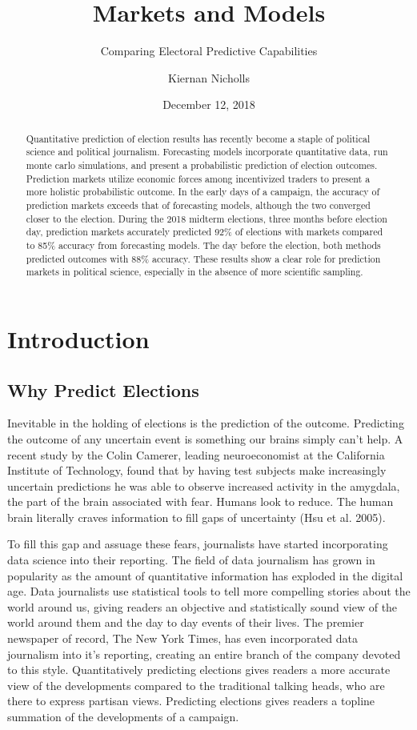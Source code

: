 \documentclass[]{article}
\title{Markets and Models}
\subtitle{Comparing Electoral Predictive Capabilities}
\author{Kiernan Nicholls}
\date{December 12, 2018}
\begin{document}
\maketitle
\begin{abstract}
Quantitative prediction of election results has recently become a staple
of political science and political journalism. Forecasting models
incorporate quantitative data, run monte carlo simulations, and present
a probabilistic prediction of election outcomes. Prediction markets
utilize economic forces among incentivized traders to present a more
holistic probabilistic outcome. In the early days of a campaign, the
accuracy of prediction markets exceeds that of forecasting models,
although the two converged closer to the election. During the 2018
midterm elections, three months before election day, prediction markets
accurately predicted 92\% of elections with markets compared to 85\%
accuracy from forecasting models. The day before the election, both
methods predicted outcomes with 88\% accuracy. These results show a
clear role for prediction markets in political science, especially in
the absence of more scientific sampling.
\end{abstract}

\section{Introduction}\label{introduction}

\subsection{Why Predict Elections}\label{why-predict-elections}

Inevitable in the holding of elections is the prediction of the outcome.
Predicting the outcome of any uncertain event is something our brains
simply can't help. A recent study by the Colin Camerer, leading
neuroeconomist at the California Institute of Technology, found that by
having test subjects make increasingly uncertain predictions he was able
to observe increased activity in the amygdala, the part of the brain
associated with fear. Humans look to reduce. The human brain literally
craves information to fill gaps of uncertainty (Hsu et al. 2005).

To fill this gap and assuage these fears, journalists have started
incorporating data science into their reporting. The field of data
journalism has grown in popularity as the amount of quantitative
information has exploded in the digital age. Data journalists use
statistical tools to tell more compelling stories about the world around
us, giving readers an objective and statistically sound view of the
world around them and the day to day events of their lives. The premier
newspaper of record, The New York Times, has even incorporated data
journalism into it's reporting, creating an entire branch of the company
devoted to this style. Quantitatively predicting elections gives readers
a more accurate view of the developments compared to the traditional
talking heads, who are there to express partisan views. Predicting
elections gives readers a topline summation of the developments of a
campaign.
\end{document}
